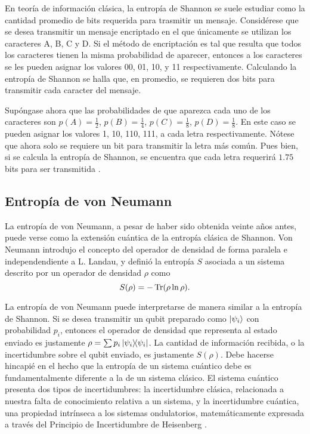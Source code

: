 En teoría de información clásica, la entropía de Shannon se suele estudiar como la cantidad promedio de bits requerida para trasmitir un mensaje. Considérese que se desea transmitir un mensaje encriptado en el que únicamente se utilizan los caracteres A, B, C y D. Si el método de encriptación es tal que resulta que todos los caracteres tienen la misma probabilidad de aparecer, entonces a los caracteres se les pueden asignar los valores 00, 01, 10, y 11 respectivamente. Calculando la entropía de Shannon se halla que, en promedio, se requieren dos bits para transmitir cada caracter del mensaje. 

Supóngase ahora que las probabilidades de que aparezca cada uno de los caracteres son $p(A)=\frac{1}{2}$, $p(B)=\frac{1}{4}$, $p(C)=\frac{1}{8}$, $p(D)=\frac{1}{8}$. En este caso se pueden asignar los valores 1, 10, 110, 111, a cada letra respectivamente. Nótese que ahora solo se requiere un bit para transmitir la letra más común. Pues bien, si se calcula la entropía de Shannon, se encuentra que cada letra requerirá $1.75$ bits para ser transmitida \cite{Chuang}.

\subsection{Entropía de von Neumann}

La entropía de von Neumann, a pesar de haber sido obtenida veinte años antes, puede verse como la extensión cuántica de la entropía clásica de Shannon. Von Neumann introdujo el concepto del operador de densidad de forma paralela e independendiente a L. Landau, y definió la entropía $S$ asociada a un sistema descrito por un operador de densidad $\rho$ como \cite{vonNeumann}
\begin{equation}\label{eq:VonNeumannEntropy}
    S(\rho)=-\Tr(\rho\ln{\rho}).
\end{equation}

La entropía de von Neumann puede interpretarse de manera similar a la entropía de Shannon. Si se desea transmitir un qubit preparado como $\ket{\psi_{i}}$ con probabilidad $p_{i}$, entonces el operador de densidad que representa al estado enviado es justamente $\rho=\sum p_{i}\dyad{\psi_{i}}$. La cantidad de información recibida, o la incertidumbre sobre el qubit enviado, es justamente $S(\rho)$. Debe hacerse hincapié en el hecho que la entropía de un sistema cuántico debe es fundamentalmente diferente a la de un sistema clásico. El sistema cuántico presenta dos tipos de incertidumbres: la incertidumbre clásica, relacionada a nuestra falta de conocimiento relativa a un sistema, y la incertidumbre cuántica, una propiedad intrínseca a los sistemas ondulatorios, matemáticamente expresada a través del Principio de Incertidumbre de Heisenberg \cite{Wilde}.


